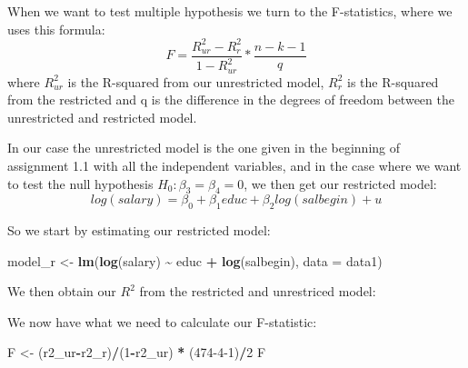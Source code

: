 \documentclass[
]{article}
\newenvironment{Shaded}{\begin{snugshade}}{\end{snugshade}}
\newcommand{\AttributeTok}[1]{\textcolor[rgb]{0.13,0.29,0.53}{#1}}
\newcommand{\DecValTok}[1]{\textcolor[rgb]{0.00,0.00,0.81}{#1}}
\newcommand{\FunctionTok}[1]{\textcolor[rgb]{0.13,0.29,0.53}{\textbf{#1}}}
\newcommand{\NormalTok}[1]{#1}
\newcommand{\OtherTok}[1]{\textcolor[rgb]{0.56,0.35,0.01}{#1}}
\newcommand{\SpecialCharTok}[1]{\textcolor[rgb]{0.81,0.36,0.00}{\textbf{#1}}}
\begin{document}
When we want to test multiple hypothesis we turn to the F-statistics,
where we uses this formula:
\[F=\frac{R^2_{ur}-R^2_{r}}{1-R^2_{ur}}*\frac{n-k-1}{q}\] where
\(R^2_{ur}\) is the R-squared from our unrestricted model, \(R^2_{r}\)
is the R-squared from the restricted and q is the difference in the
degrees of freedom between the unrestricted and restricted model.

In our case the unrestricted model is the one given in the beginning of
assignment 1.1 with all the independent variables, and in the case where
we want to test the null hypothesis \(H_0: \beta_3 = \beta_4 = 0\), we
then get our restricted model:
\[log(salary)=\beta_0+\beta_1educ+\beta_2log(salbegin)+u\]

So we start by estimating our restricted model:

\begin{Shaded}
\begin{Highlighting}[]
\NormalTok{model\_r }\OtherTok{\textless{}{-}} \FunctionTok{lm}\NormalTok{(}\FunctionTok{log}\NormalTok{(salary) }\SpecialCharTok{\textasciitilde{}}\NormalTok{ educ }\SpecialCharTok{+} \FunctionTok{log}\NormalTok{(salbegin), }\AttributeTok{data =}\NormalTok{ data1)}
\end{Highlighting}
\end{Shaded}

We then obtain our \(R^2\) from the restricted and unrestriced model:

\begin{Shaded}
\end{Shaded}

We now have what we need to calculate our F-statistic:

\begin{Shaded}
\begin{Highlighting}[]
\NormalTok{F }\OtherTok{\textless{}{-}}\NormalTok{ (r2\_ur}\SpecialCharTok{{-}}\NormalTok{r2\_r)}\SpecialCharTok{/}\NormalTok{(}\DecValTok{1}\SpecialCharTok{{-}}\NormalTok{r2\_ur) }\SpecialCharTok{*}\NormalTok{ (}\DecValTok{474{-}4{-}1}\NormalTok{)}\SpecialCharTok{/}\DecValTok{2}
\NormalTok{F}
\end{Highlighting}
\end{Shaded}
\end{document}
